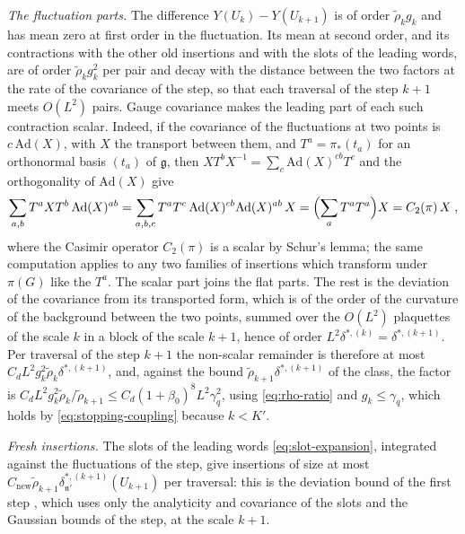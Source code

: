 \documentclass[11pt]{preprint}
\numberwithin{equation}{section}
\theoremstyle{definition}
\theoremstyle{remark}
\theoremstyle{plain}
\begin{document}
\emph{The fluctuation parts.} The difference $Y(U_k) - Y(U_{k+1})$ is of order $\tilde\rho_kg_k$ and has mean zero at first order in the fluctuation. Its mean at second order, and its contractions with the other old insertions and with the slots of the leading words, are of order $\tilde\rho_kg_k^2$ per pair and decay with the distance between the two factors at the rate of the covariance of the step, so that each traversal of the step $k + 1$ meets $O(L^2)$ pairs. Gauge covariance makes the leading part of each such contraction scalar. Indeed, if the covariance of the fluctuations at two points is $c\,\mathrm{Ad}(X)$, with $X$ the transport between them, and $T^a = \pi_*(t_a)$ for an orthonormal basis $(t_a)$ of $\mathfrak g$, then $XT^bX^{-1} = \sum_c\mathrm{Ad}(X)^{cb}T^c$ and the orthogonality of $\mathrm{Ad}(X)$ give
\begin{equation}\label{eq:casimir-contraction}
    \sum_{a,b}T^aXT^b\,\mathrm{Ad}(X)^{ab} = \sum_{a,b,c}T^aT^c\,\mathrm{Ad}(X)^{cb}\mathrm{Ad}(X)^{ab}\,X = \Bigl(\sum_aT^aT^a\Bigr)X = C_2(\pi)\,X\;,
\end{equation}
where the Casimir operator $C_2(\pi)$ is a scalar by Schur's lemma; the same computation applies to any two families of insertions which transform under $\pi(G)$ like the $T^a$. The scalar part joins the flat parts. The rest is the deviation of the covariance from its transported form, which is of the order of the curvature of the background between the two points, summed over the $O(L^2)$ plaquettes of the scale $k$ in a block of the scale $k + 1$, hence of order $L^2\delta^{*,(k)} = \delta^{*,(k+1)}$. Per traversal of the step $k + 1$ the non-scalar remainder is therefore at most $C_dL^2g_k^2\tilde\rho_k\delta^{*,(k+1)}$, and, against the bound $\tilde\rho_{k+1}\delta^{*,(k+1)}$ of the class, the factor is $C_dL^2g_k^2\tilde\rho_k/\tilde\rho_{k+1} \leq C_d(1 + \beta_0)^8L^2\gamma_q^2$, using \eqref{eq:rho-ratio} and $g_k \leq \gamma_q$, which holds by \eqref{eq:stopping-coupling} because $k < K'$.

\emph{Fresh insertions.} The slots of the leading words \eqref{eq:slot-expansion}, integrated against the fluctuations of the step, give insertions of size at most $C_{\mathrm{new}}\tilde\rho_{k+1}\delta^{*,(k+1)}_{\mathfrak n'}(U_{k+1})$ per traversal: this is the deviation bound of the first step \cite[Section~9]{WilsonFirstStep}, which uses only the analyticity and covariance of the slots and the Gaussian bounds of the step, at the scale $k + 1$.
\end{document}

